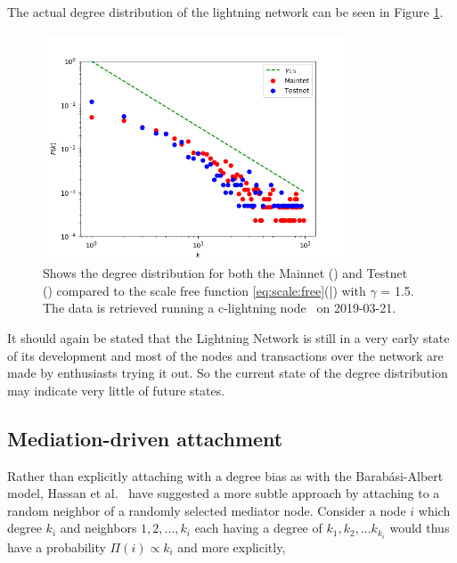 
The actual degree distribution of the lightning network can be seen in Figure \ref{fig:real_network}.

\begin{figure}[!htb]
	\hspace*{-0.5cm} 
	\centering
	\includegraphics[width=9cm]{images/main-testnet_degree_distribution.png}
	\caption{Shows the degree distribution for both the Mainnet (\tikzcircle[red, fill=red]{2pt}) and Testnet (\tikzcircle[blue, fill=blue]{2pt})
		compared to the scale free function \ref{eq:scale:free}(\textcolor{black}{|}) with $\gamma$ = 1.5. The data is retrieved running a c-lightning \gls{node}~\cite{repository:clightning} on 2019-03-21.
	}
	\label{fig:real_network}
	\hspace*{2mm}
\end{figure}

It should again be stated that the \gls{Lightning Network} is still in a very early state of its development and most of the \gls{node}s and transactions over the network are made by enthusiasts trying it out. So the current state of the \gls{degree distribution} may indicate very little of future states. 

\subsection{Mediation-driven attachment}

Rather than explicitly attaching with a degree bias as with the Barabási-Albert model, Hassan et al.~\cite{hassan:islam:haque:mediation} have suggested a more subtle approach by attaching to a random neighbor of a randomly selected mediator \gls{node}. Consider a node $i$ which degree $k_i$ and neighbors $1,2,...,k_i$ each having a degree of $k_1, k_2, ... k_{k_i}$ would thus have a probability $\Pi(i) \propto k_i$ and more explicitly,

